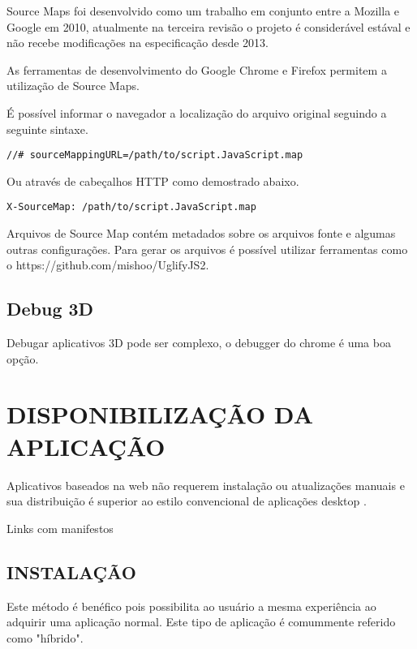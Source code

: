 Source Maps foi desenvolvido como um trabalho em conjunto entre a
Mozilla e Google em 2010, atualmente na terceira revisão o projeto é
considerável estával e não recebe modificações na especificação
desde 2013.

As ferramentas de desenvolvimento do Google Chrome e Firefox permitem a
utilização de Source Maps.

É possível informar o navegador a localização do arquivo original
seguindo a seguinte sintaxe.

\begin{verbatim}
//# sourceMappingURL=/path/to/script.JavaScript.map
\end{verbatim}

Ou através de cabeçalhos HTTP como demostrado abaixo.

\begin{verbatim}
X-SourceMap: /path/to/script.JavaScript.map
\end{verbatim}

Arquivos de Source Map contém metadados sobre os arquivos fonte e
algumas outras configurações.
Para gerar os arquivos é possível utilizar ferramentas como o
https://github.com/mishoo/UglifyJS2.

\begin{draft}
\subsection{Debug 3D}
Debugar aplicativos 3D pode ser complexo, o debugger do chrome é uma boa opção.

\end{draft}
\section{DISPONIBILIZAÇÃO DA APLICAÇÃO}
\begin{draft}
Aplicativos baseados na web não requerem instalação ou atualizações
manuais e sua distribuição é superior ao estilo convencional de
aplicações desktop \autocite{browserGamesTechnologyAndFuture}.

Links com manifestos


\subsection{INSTALAÇÃO}
Este método é benéfico pois possibilita ao usuário a mesma
experiência ao adquirir uma aplicação normal. Este tipo de
aplicação é comummente referido como "híbrido".

\end{draft}

